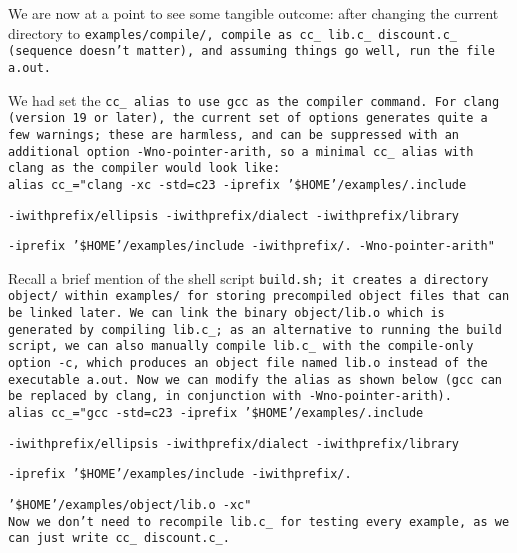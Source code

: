 We are now at a point to see some tangible outcome:
after changing the current directory to \tt{examples/compile/},
compile as \tt{cc_ lib.c_ discount.c_} (sequence doesn't matter),
and assuming things go well, run the file \tt{a.out}.


We had set the \tt{cc_} alias to use \tt{gcc} as the compiler command.
For \tt{clang} (version 19 or later),
the current set of options generates quite a few warnings; these are harmless,
and can be suppressed with an additional option \tt{-Wno-pointer-arith}, so a
minimal \tt{cc_} alias with \tt{clang} as the compiler would look like:\\

\tt{alias cc_="clang -xc -std=c23 -iprefix '\$HOME'/examples/.include \\}

\tt{-iwithprefix/ellipsis -iwithprefix/dialect -iwithprefix/library \\}

\tt{-iprefix '\$HOME'/examples/include -iwithprefix/. -Wno-pointer-arith"}

Recall a brief mention of the shell script \tt{build.sh};
it creates a directory \tt{object/} within \tt{examples/}
for storing precompiled object files that can be linked later.
We can link the binary \tt{object/lib.o}
which is generated by compiling \tt{lib.c_};
as an alternative to running the build script,
we can also manually compile \tt{lib.c_} with the compile-only option \tt{-c},
which produces an object file named \tt{lib.o}
instead of the executable \tt{a.out}.
Now we can modify the alias as shown below (\tt{gcc} can be
replaced by \tt{clang}, in conjunction with \tt{-Wno-pointer-arith}).\\

\tt{alias cc_="gcc -std=c23 -iprefix '\$HOME'/examples/.include \\}

\tt{-iwithprefix/ellipsis -iwithprefix/dialect -iwithprefix/library \\}

\tt{-iprefix '\$HOME'/examples/include -iwithprefix/. \\}

\tt{'\$HOME'/examples/object/lib.o -xc"}\\

Now we don't need to recompile \tt{lib.c_} for testing every example,
as we can just write \tt{cc_ discount.c_}.
